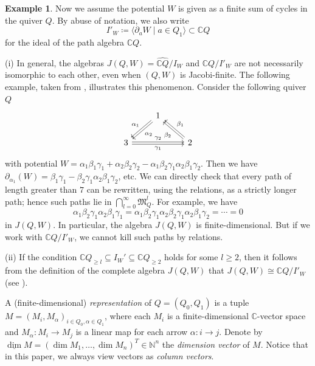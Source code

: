 \documentclass[12pt]{amsart}
\theoremstyle{definition}
\newtheorem{example}[theorem]{Example}
\theoremstyle{remark}
\numberwithin{equation}{section}
\newcommand{\fM}{\mathfrak{M}}
\newcommand{\al}{\alpha}
\newcommand{\be}{\beta}
\newcommand{\ga}{\gamma}
\begin{document}
    \begin{example}\label{ex:QP2}
       Now we assume the potential $W$ is given as a finite sum of cycles in the quiver $Q$. By abuse of notation, we also write \[I'_W \coloneqq \langle \partial_a W\mid a\in Q_1\rangle \subset \mathbb{C}Q\] for the ideal of the path algebra $\mathbb{C}Q$.

            (i) In general, the algebras $J(Q,W)=\widehat{\mathbb CQ}/I_W$ and $\mathbb{C}Q/I'_W$ are not necessarily isomorphic to each other, even when $(Q, W)$ is Jacobi-finite. The following example, taken from \cite{Lab09,Lab09-b}, illustrates this phenomenon. 
       Consider the following quiver $Q$ 
    \[\begin{tikzcd}
& 1 \arrow[dl,shift left=0.3ex,"\alpha_2"] \arrow[dl,shift right=0.3ex,"\alpha_1"'] &
\\
3 \arrow[rr,shift left=0.3ex,"\gamma_2"] \arrow[rr,shift right=0.3ex,"\gamma_1"']& & 2 \arrow[ul,shift left=0.3ex,"\beta_2"] \arrow[ul,shift right=0.3ex,"\beta_1"']
\end{tikzcd}\]
with potential $W=\al_1\be_1\ga_1 + \al_2\be_2\ga_2 - \al_1\be_2\ga_1\al_2\be_1\ga_2$. Then we have $\partial_{\al_1}(W) = \be_1\ga_1 - \be_2\ga_1\al_2\be_1\ga_2$, etc. 
We can directly check that every path of length greater than $7$ can be rewritten, using the relations, as a strictly longer path; hence such paths lie in $\bigcap_{l=0}^\infty \fM_Q^l$. For example, we have
\[\al_1\be_2\ga_1\al_2\be_1\ga_1 = \al_1\be_2\ga_1\al_2\be_2\ga_1\al_2\be_1\ga_2 = \cdots = 0\]
in $J(Q,W)$. In particular, the algebra $J(Q,W)$ is finite-dimensional. But if we work with $\mathbb{C}Q/I'_W$, we cannot kill such paths by relations.

(ii) 
If the condition $\mathbb{C}Q_{\geq l}\subseteq I_W'\subseteq \mathbb{C}Q_{\geq 2}$ holds for some $l\geq 2$, then it follows from the definition of the complete algebra $J(Q,W)$ that $J(Q,W) \cong \mathbb{C}Q/I'_W$ (see \cite[Proposition 3.3]{Pasquali-2020}). 
    \end{example}


A (finite-dimensional) {\em representation} of $Q=(Q_0,Q_1)$ is a tuple $M=(M_i, M_\alpha)_{i\in Q_0,\alpha\in Q_1}$, where each $M_i$ is a finite-dimensional $\mathbb C$-vector space and $M_\alpha\colon M_i\rightarrow M_j$ is a linear map for each arrow $\alpha\colon i\rightarrow j$. Denote by $\underline \dim M=(\dim M_1,\ldots,\dim M_n)^T\in\mathbb N^n$ the {\em dimension vector} of $M$. Notice that in this paper, we always view  vectors as  {\em column vectors}. 
\end{document}
